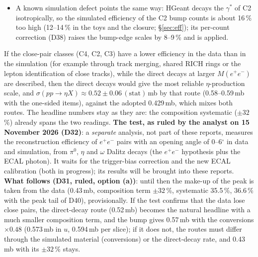 \documentclass[11pt,a4paper]{article}
\newcommand{\piz}{\ensuremath{\pi^{0}}\xspace}
\newcommand{\ee}{\ensuremath{e^{+}e^{-}}\xspace}
\newcommand{\Mee}{\ensuremath{M(e^{+}e^{-})}\xspace}
\newcommand{\sigeta}{\ensuremath{\sigma(pp\to\eta X)}\xspace}
\begin{document}
{\begin{itemize}
      side-band fit; 0.423 in WP8's sums), 2.3$\sigma$.
\item A known simulation defect points the same way: HGeant decays the $\gamma^*$ of C2 isotropically, so the simulated efficiency of the C2
      bump counts is about 16\,\% too high (12--14\,\% in the toys and the closure; \S\ref{sec:eff}); its per-count correction (D38) raises the
      bump-edge scales by 8--9\,\% and is applied.
\end{itemize}
If the close-pair classes (C4, C2, C3) have a lower efficiency in the data than in the simulation (for example through track merging, shared
RICH rings or the lepton identification of close tracks), while the direct decays at larger \Mee are described, then the direct decays would give
the most reliable $\eta$-production scale, and \sigeta $\approx0.52\pm0.06\,(\mathrm{stat})$\,mb by that route (0.58--0.59\,mb with the one-sided
items), against the adopted 0.429\,mb, which mixes both routes. The headline numbers stay as they are: the composition systematic ($\pm32$\,\%)
already spans the two readings. \textbf{The test, as ruled by the analyst on 15 November 2026 (D32)}: a \emph{separate} analysis, not part
of these reports, measures the reconstruction efficiency of \ee pairs with an opening angle of 0--6$^\circ$ in data and simulation, from \piz,
$\eta$ and $\omega$ Dalitz decays (the \ee hypothesis plus the ECAL photon). It waits for the trigger-bias correction and the new ECAL calibration
(both in progress); its results will be brought into these reports. \textbf{What follows (D31, ruled, option (a))}: until then the make-up of the
peak is taken from the data (0.43\,mb, composition term $\pm32$\,\%, systematic 35.5\,\%, 36.6\,\% with the peak tail of D40), provisionally. If
the test confirms that the data lose close pairs, the direct-decay route (0.52\,mb) becomes the natural headline with a much smaller composition
term, and the bump gives 0.57\,mb with the conversions $\times0.48$ (0.573\,mb in $u$, 0.594\,mb per slice); if it does not, the routes must differ through the simulated material
(conversions) or the direct-decay rate, and 0.43\,mb with its $\pm32$\,\% stays.}
\end{document}
